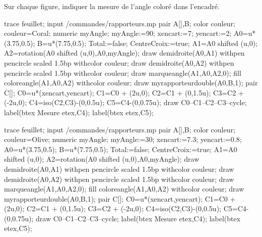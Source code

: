 \begin{exercice*}
   Sur chaque figure, indiquer la mesure de l'angle coloré dans l'encadré.

   \begin{Geometrie}[CoinHD={(9.5u,4.5u)}]
      trace feuillet;
      input \persopath/commandes/rapporteurs.mp
      pair A[],B;
      color couleur;
      couleur=Coral;
      numeric myAngle;
      myAngle:=90;
      xencart:=7;
      yencart:=2;
      A0=u*(3.75,0.5);
      B=u*(7.75,0.5);
      Total:=false;%
      CentreCroix:=true;%
      A1=A0 shifted (u,0); 
      A2=rotation(A0 shifted (u,0),A0,myAngle);
      draw demidroite(A0,A1) withpen pencircle scaled 1.5bp withcolor couleur;
      draw demidroite(A0,A2) withpen pencircle scaled 1.5bp withcolor couleur;
      draw marqueangle(A1,A0,A2,0);
      fill coloreangle(A1,A0,A2) withcolor couleur;
      draw myrapporteurdouble(A0,B,1);
      pair C[];
      C0=u*(xencart,yencart);
      C1=C0 + (2u,0); 
      C2=C1 + (0,1.5u);
      C3=C2 + (-2u,0);
      C4=iso(C2,C3)-(0,0.5u);
      C5=C4-(0,0.75u);
      draw C0--C1--C2--C3--cycle;
      label(btex Mesure etex,C4);
      label(btex \makebox[0.2\linewidth]{\dotfill} etex,C5);      
   \end{Geometrie}

   \begin{Geometrie}[CoinHD={(9.5u,4.5u)}]
      trace feuillet;
      input \persopath/commandes/rapporteurs.mp
      pair A[],B;
      color couleur;
      couleur=Olive;
      numeric myAngle;
      myAngle:=30;
      xencart:=7.3;
      yencart:=0.8;
      A0=u*(3.75,0.5);
      B=u*(7.75,0.5);
      Total:=false;%
      CentreCroix:=true;%
      A1=A0 shifted (u,0); 
      A2=rotation(A0 shifted (u,0),A0,myAngle);           
      draw demidroite(A0,A1) withpen pencircle scaled 1.5bp withcolor couleur;
      draw demidroite(A0,A2) withpen pencircle scaled 1.5bp withcolor couleur;
      draw marqueangle(A1,A0,A2,0);
      fill coloreangle(A1,A0,A2) withcolor couleur;
      draw myrapporteurdouble(A0,B,1);
      pair C[];
      C0=u*(xencart,yencart);
      C1=C0 + (2u,0); 
      C2=C1 + (0,1.5u);
      C3=C2 + (-2u,0);
      C4=iso(C2,C3)-(0,0.5u);
      C5=C4-(0,0.75u);
      draw C0--C1--C2--C3--cycle;
      label(btex Mesure etex,C4);
      label(btex \makebox[0.2\linewidth]{\dotfill} etex,C5);      
   \end{Geometrie}


\end{exercice*}
